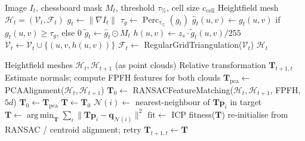 \documentclass[review]{elsarticle}
\DeclareMathOperator*{\argmin}{arg\,min}
\begin{document}
\begin{algorithm}[h]
\caption{Pseudo-3D Heightfield Mesh Construction}
\label{alg:heightfield}
\begin{algorithmic}[1]
\REQUIRE Image $I_t$, chessboard mask $M_t$, threshold $\tau_{\%}$, cell size $c_{\mathrm{cell}}$
\ENSURE Heightfield mesh $\mathcal{H}_t = (\mathcal{V}_t, \mathcal{F}_t)$
\STATE $g_t \leftarrow \|\nabla I_t\|$ 
\STATE $\tau_g \leftarrow \operatorname{Perc}_{\tau_{\%}}(g_t)$ 
\STATE $\hat{g}_t(u,v) \leftarrow g_t(u,v)$ if $g_t(u,v) \geq \tau_g$, else $0$
\STATE $\tilde{g}_t \leftarrow \hat{g}_t \odot M_t$ 
    \STATE $h(u,v) \leftarrow z_s \cdot \tilde{g}_t(u,v) / 255$ 
    \STATE $\mathcal{V}_t \leftarrow \mathcal{V}_t \cup \{(u,v,h(u,v))\}$
\ENDFOR
\STATE $\mathcal{F}_t \leftarrow$ RegularGridTriangulation($\mathcal{V}_t$)
\RETURN $\mathcal{H}_t$
\end{algorithmic}
\end{algorithm}

\begin{algorithm}[h]
\caption{Heightfield-Based Pose Estimation}
\label{alg:pose}
\begin{algorithmic}[1]
\REQUIRE Heightfield meshes $\mathcal{H}_t, \mathcal{H}_{t+1}$ (as point clouds)
\ENSURE Relative transformation $\mathbf{T}_{t+1,t}$
\STATE Estimate normals; compute FPFH features for both clouds
\STATE $\mathbf{T}_{\mathrm{pca}} \leftarrow$ PCAAlignment($\mathcal{H}_t, \mathcal{H}_{t+1}$) 
    \STATE $\mathbf{T}_0 \leftarrow$ RANSACFeatureMatching($\mathcal{H}_t, \mathcal{H}_{t+1}$, FPFH, $5d$) 
\ELSE
    \STATE $\mathbf{T}_0 \leftarrow \mathbf{T}_{\mathrm{pca}}$
\ENDIF
\STATE $\mathbf{T} \leftarrow \mathbf{T}_0$
    \STATE $\mathcal{N}(i) \leftarrow$ nearest-neighbour of $\mathbf{T}\mathbf{p}_i$ in target
    \STATE $\mathbf{T} \leftarrow \argmin_{\mathbf{T}} \sum_i \|\mathbf{T}\mathbf{p}_i - \mathbf{q}_{\mathcal{N}(i)}\|^2$ 
\ENDWHILE
\STATE $\mathrm{fit} \leftarrow$ ICP fitness($\mathbf{T}$)
    \STATE re-initialise from RANSAC / centroid alignment; retry
\ENDIF
\RETURN $\mathbf{T}_{t+1,t} \leftarrow \mathbf{T}$
\end{algorithmic}
\end{algorithm}
\end{document}
